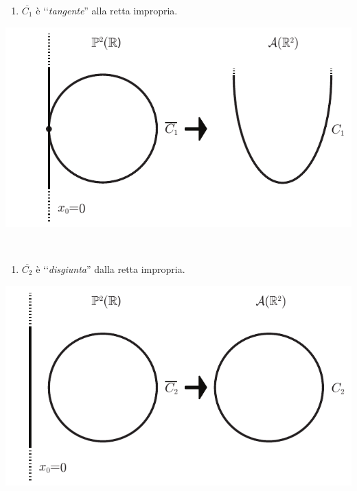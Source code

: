 \begin{examples}
			\begin{minipage}{0.57\textwidth}
			\begin{enumerate}[series=proj2]
				\item $\overline{C_1}$ è ‘‘\textit{tangente}'' alla retta impropria.
			\end{enumerate}
		\end{minipage}
		\begin{minipage}{0.52\textwidth}
					\includegraphics[trim=0cm 0cm 0cm 0cm,clip,scale=0.50]{images/projconic1.pdf}
		\end{minipage}\\
	\begin{minipage}{0.57\textwidth}
		\begin{enumerate}[resume=proj2]
		\item $\overline{C_2}$ è ‘‘\textit{disgiunta}'' dalla retta impropria.
		\end{enumerate}
	\end{minipage}
	\begin{minipage}{0.52\textwidth}
					\includegraphics[trim=0cm 0cm 0cm 0cm,clip,scale=0.50]{images/projconic2.pdf}

\end{minipage}
\end{examples}
